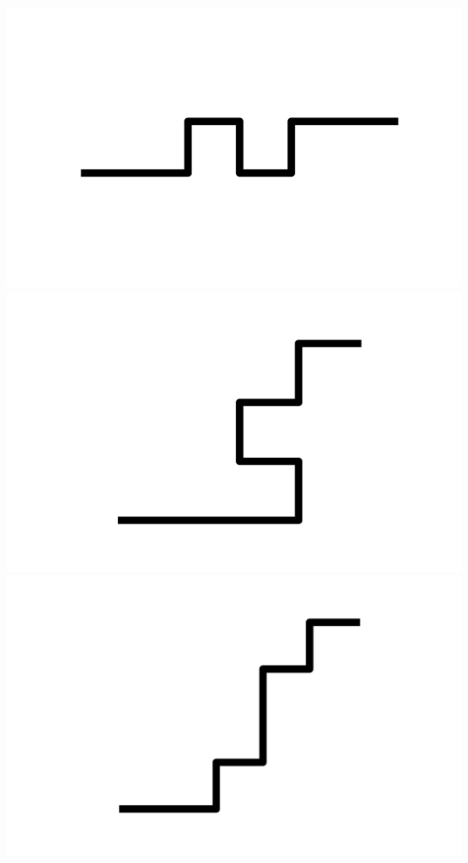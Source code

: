 \documentclass[]{report}
\begin{document}
\includegraphics[scale=.1]{pictures/21/state_cluster_shapes_277.pdf} 
\includegraphics[scale=.1]{pictures/21/state_cluster_shapes_278.pdf} 
\includegraphics[scale=.1]{pictures/21/state_cluster_shapes_279.pdf} 
\end{document}
